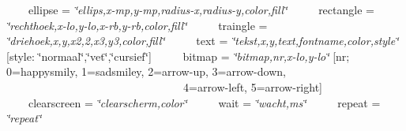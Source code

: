  ~~~~ellipse = {\itshape \char`\"{}ellips,x-\/mp,y-\/mp,radius-\/x,radius-\/y,color,fill\char`\"{}}~\newline
 ~~~~rectangle = {\itshape \char`\"{}rechthoek,x-\/lo,y-\/lo,x-\/rb,y-\/rb,color,fill\char`\"{}}~\newline
 ~~~~traingle = {\itshape \char`\"{}driehoek,x,y,x2,2,x3,y3,color,fill\char`\"{}}~\newline
 ~~~~text = {\itshape \char`\"{}tekst,x,y,text,fontname,color,style\char`\"{}} \mbox{[}style\+: \char`\"{}normaal\char`\"{},\char`\"{}vet\char`\"{},\char`\"{}cursief\char`\"{}\mbox{]}~\newline
 ~~~~bitmap = {\itshape \char`\"{}bitmap,nr,x-\/lo,y-\/lo\char`\"{}} \mbox{[}nr; 0=happysmily, 1=sadsmiley, 2=arrow-\/up, 3=arrow-\/down,~\newline
 ~~~~~~~~~~~~~~~~~~~~~~~~~~~~~~~~4=arrow-\/left, 5=arrow-\/right\mbox{]}~\newline
 ~~~~clearscreen = {\itshape \char`\"{}clearscherm,color\char`\"{}}~\newline
 ~~~~wait = {\itshape \char`\"{}wacht,ms\char`\"{}}~\newline
 ~~~~repeat = {\itshape \char`\"{}repeat\char`\"{}}~\newline


